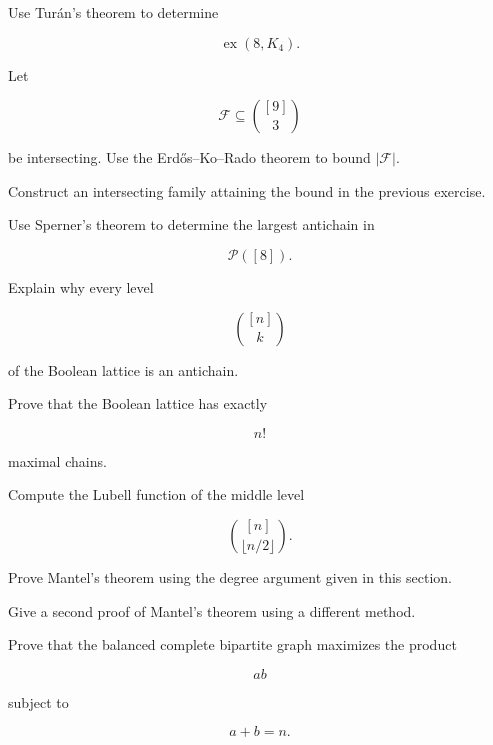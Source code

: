 \begin{exercise}[2]
Use Tur\'an's theorem to determine

\[
\operatorname{ex}(8,K_4).
\]
\end{exercise}

\begin{exercise}[2]
Let

\[
\mathcal{F}
\subseteq
\binom{[9]}{3}
\]

be intersecting. Use the Erd\H{o}s--Ko--Rado theorem to bound
\(|\mathcal{F}|\).
\end{exercise}

\begin{exercise}[2]
Construct an intersecting family attaining the bound in the previous
exercise.
\end{exercise}

\begin{exercise}[2]
Use Sperner's theorem to determine the largest antichain in

\[
\mathcal{P}([8]).
\]
\end{exercise}

\begin{exercise}[2]
Explain why every level

\[
\binom{[n]}{k}
\]

of the Boolean lattice is an antichain.
\end{exercise}

\begin{exercise}[2]
Prove that the Boolean lattice has exactly

\[
n!
\]

maximal chains.
\end{exercise}

\begin{exercise}[2]
Compute the Lubell function of the middle level

\[
\binom{[n]}{\lfloor n/2\rfloor}.
\]
\end{exercise}

\begin{exercise}[3]
Prove Mantel's theorem using the degree argument given in this section.
\end{exercise}

\begin{exercise}[3]
Give a second proof of Mantel's theorem using a different method.
\end{exercise}

\begin{exercise}[3]
Prove that the balanced complete bipartite graph maximizes the product

\[
ab
\]

subject to

\[
a+b=n.
\]
\end{exercise}

